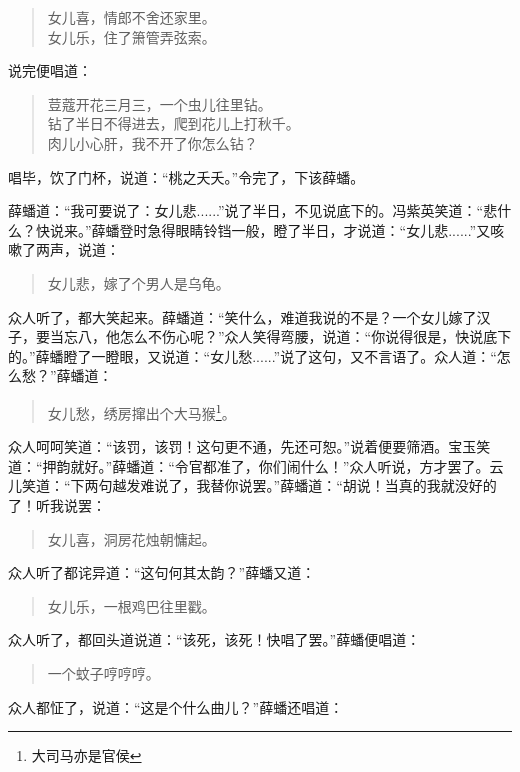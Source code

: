 \documentclass[12pt,oneside]{book}
\newenvironment{shici}{%
\begin{verse}%
\centering\large\hspace{12pt}}%
{\end{verse}}
\begin{document}
\begin{shici}
女儿喜，情郎不舍还家里。\\
女儿乐，住了箫管弄弦索。
\end{shici}


说完便唱道：

\begin{shici}
荳蔻开花三月三，一个虫儿往里钻。\\
钻了半日不得进去，爬到花儿上打秋千。\\
肉儿小心肝，我不开了你怎么钻？
\end{shici}

唱毕，饮了门杯，说道：“桃之夭夭。”令完了，下该薛蟠。

薛蟠道：“我可要说了：女儿悲......”说了半日，不见说底下的。冯紫英笑道：“悲什么？快说来。”薛蟠登时急得眼睛铃铛一般，瞪了半日，才说道：“女儿悲......”又咳嗽了两声，说道：

\begin{shici}
女儿悲，嫁了个男人是乌龟。
\end{shici}

众人听了，都大笑起来。薛蟠道：“笑什么，难道我说的不是？一个女儿嫁了汉子，要当忘八，他怎么不伤心呢？”众人笑得弯腰，说道：“你说得很是，快说底下的。”薛蟠瞪了一瞪眼，又说道：“女儿愁......”说了这句，又不言语了。众人道：“怎么愁？”薛蟠道：

\begin{shici}
女儿愁，绣房撺出个大马猴\footnote{大司马亦是官侯}。
\end{shici}

众人呵呵笑道：“该罚，该罚！这句更不通，先还可恕。”说着便要筛酒。宝玉笑道：“押韵就好。”薛蟠道：“令官都准了，你们闹什么！”众人听说，方才罢了。云儿笑道：“下两句越发难说了，我替你说罢。”薛蟠道：“胡说！当真的我就没好的了！听我说罢：

\begin{shici}
女儿喜，洞房花烛朝慵起。
\end{shici}

众人听了都诧异道：“这句何其太韵？”薛蟠又道：

\begin{shici}
女儿乐，一根鸡巴往里戳。
\end{shici}

众人听了，都回头道说道：“该死，该死！快唱了罢。”薛蟠便唱道：

\begin{shici}
一个蚊子哼哼哼。
\end{shici}


众人都怔了，说道：“这是个什么曲儿？”薛蟠还唱道：
\end{document}
